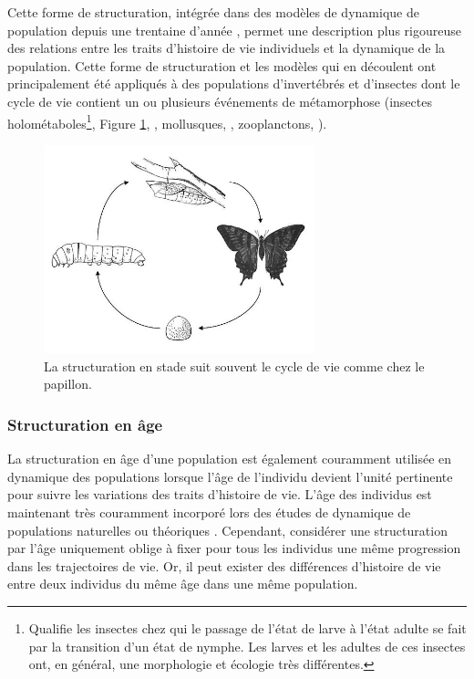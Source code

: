 Cette forme de structuration, intégrée dans des modèles de dynamique de
population depuis une trentaine d'année \autocites{gurney1983a,nisbet1983a},
permet une description plus rigoureuse des relations entre les traits d'histoire
de vie individuels et la dynamique de la population. Cette forme de
structuration et les modèles qui en découlent \autocites{nisbet1989a} ont
principalement été appliqués à des populations d'invertébrés et d'insectes dont
le cycle de vie contient un ou plusieurs événements de métamorphose (insectes
holométaboles\footnote{Qualifie les insectes chez qui le passage de l'état de
larve à l'état adulte se fait par la transition d'un état de nymphe. Les larves
et les adultes de ces insectes ont, en général, une morphologie et écologie très
différentes.}, Figure \ref{fig:stade},
\citealp{barclay1980model,gurney1980a,nisbet1983a}, mollusques,
\citealp{taris2006phenotypic}, zooplanctons, \citealp{mccauley1996a}).

\begin{figure}[H]
\centering
\includegraphics[width=0.7\textwidth]{1_CorpsDeThese/EA/Fig/stage}
\caption[structuration en stade]{La
structuration en stade suit souvent le cycle de vie comme chez le papillon.}\label{fig:stade}
\end{figure}

\subsubsection{Structuration en âge}

La structuration en âge d'une population est également couramment utilisée en
dynamique des populations lorsque l'âge de l'individu devient l'unité pertinente
pour suivre les variations des traits d'histoire de vie. L'âge des individus est
maintenant très couramment incorporé lors des études de dynamique de populations
naturelles ou théoriques
\autocite[par ex.
][]{coulson2008a,marteinsdottir2002a,worden2010a,robinson2013a}.
Cependant, considérer une structuration par l'âge uniquement oblige à fixer pour
tous les individus une même progression dans les trajectoires de vie. Or, il
peut exister des différences d'histoire de vie entre deux individus du même âge
dans une même population.

